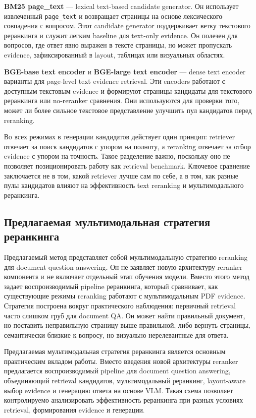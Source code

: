 \documentclass[conference]{IEEEtran}
\begin{document}
\textbf{BM25 page\_text} --- lexical text-based candidate generator. Он использует извлеченный \texttt{page\_text} и возвращает страницы на основе лексического совпадения с вопросом. Этот candidate generator поддерживает ветку текстового реранкинга и служит легким baseline для text-only evidence. Он полезен для вопросов, где ответ явно выражен в тексте страницы, но может пропускать evidence, зафиксированный в layout, таблицах или визуальных областях.

\textbf{BGE-base text encoder} и \textbf{BGE-large text encoder} --- dense text encoder варианты для page-level text evidence retrieval. Эти encoders работают с доступным текстовым evidence и формируют страницы-кандидаты для текстового реранкинга или no-reranker сравнения. Они используются для проверки того, может ли более сильное текстовое представление улучшить пул кандидатов перед reranking.

Во всех режимах в генерации кандидатов действует один принцип: retriever отвечает за поиск кандидатов с упором на полноту, а reranking отвечает за отбор evidence с упором на точность. Такое разделение важно, поскольку оно не позволяет позиционировать работу как retrieval benchmark. Ключевое сравнение заключается не в том, какой retriever лучше сам по себе, а в том, как разные пулы кандидатов влияют на эффективность text reranking и мультимодального реранкинга.

\subsection{Предлагаемая мультимодальная стратегия реранкинга}

Предлагаемый метод представляет собой мультимодальную стратегию reranking для document question answering. Он не заявляет новую архитектуру reranker-компонента и не включает отдельный этап обучения модели. Вместо этого метод задает воспроизводимый pipeline реранкинга, который сравнивает, как существующие режимы reranking работают с мультимодальным PDF evidence. Стратегия построена вокруг практического наблюдения: первичный retrieval часто слишком груб для document QA. Он может найти правильный документ, но поставить неправильную страницу выше правильной, либо вернуть страницы, семантически близкие к вопросу, но визуально нерелевантные для ответа.

Предлагаемая мультимодальная стратегия реранкинга является основным практическим вкладом работы. Вместо введения новой архитектуры reranker предлагается воспроизводимый pipeline для document question answering, объединяющий retrieval кандидатов, мультимодальный реранкинг, layout-aware выбор evidence и генерацию ответа на основе VLM. Такая схема позволяет контролируемо анализировать эффективность реранкинга при разных условиях retrieval, формирования evidence и генерации.
\end{document}
